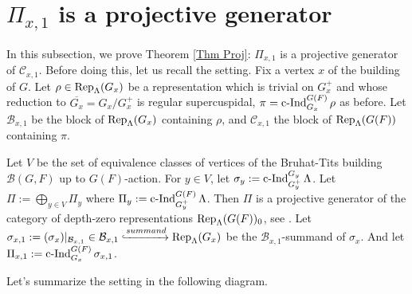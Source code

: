 		
		
		
		\section{$\Pi_{x,1}$ is a projective generator}\label{Section projective generator}
		
		In this subsection, we prove Theorem \ref{Thm Proj}: $\Pi_{x,1}$ is a projective generator of $\mathcal{C}_{x,1}$. Before doing this, let us recall the setting. Fix a vertex $x$ of the building of $G$. Let $\rho \in \operatorname{\operatorname{Rep}}_{\Lambda}(G_x)$ be a representation which is trivial on $G_x^+$ and whose reduction to $\overline{G_x}=G_x/G_x^+$ is regular supercuspidal, $\pi=\operatorname{\operatorname{c-Ind}}_{G_x}^{G(F)}\rho$ as before. Let $\mathcal{B}_{x,1}$ be the block of $\operatorname{\operatorname{Rep}}_{\Lambda}(G_x)$ containing $\rho$, and $\mathcal{C}_{x,1}$ the block of $\operatorname{\operatorname{Rep}}_{\Lambda}(G(F))$ containing $\pi$. 
		
		Let $V$ be the set of equivalence classes of vertices of the Bruhat-Tits building $\mathcal{B}(G, F)$ up to $G(F)$-action. For $y \in V$, let $\sigma_y:=\operatorname{\operatorname{c-Ind}}_{G_y^+}^{G_y}\Lambda$. Let $\Pi:=\bigoplus_{y \in V}\Pi_y$ where $\Pi_y:=\operatorname{\operatorname{c-Ind}}_{G_y^+}^{G(F)}\Lambda$. Then $\Pi$ is a projective generator of the category of depth-zero representations $\operatorname{\operatorname{Rep}}_{\Lambda}(G(F))_0$, see \cite[Appendix]{dat2009finitude}. Let $\sigma_{x,1}:=(\sigma_x)|_{\mathcal{B}_{x,1}} \in \mathcal{B}_{x,1} \xhookrightarrow{summand} \operatorname{\operatorname{Rep}}_{\Lambda}(G_x)$ be the $\mathcal{B}_{x,1}$-summand of $\sigma_x$. And let $\Pi_{x,1}:=\operatorname{\operatorname{c-Ind}}_{G_x}^{G(F)}\sigma_{x,1}$.
		
		Let's summarize the setting in the following diagram.
		
		
